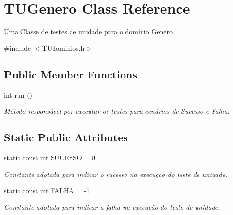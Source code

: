 \hypertarget{classTUGenero}{}\section{T\+U\+Genero Class Reference}
\label{classTUGenero}


Uma Classe de testes de unidade para o domínio \hyperlink{classGenero}{Genero}.  




{\ttfamily \#include $<$T\+Udominios.\+h$>$}

\subsection*{Public Member Functions}
\begin{DoxyCompactItemize}
\item 
int \hyperlink{classTUGenero_ade5f70b689c22924dfbd50bfabf0666c}{run} ()
\begin{DoxyCompactList}\small\item\em Método responsável por executar os testes para cenários de Sucesso e Falha. \end{DoxyCompactList}\end{DoxyCompactItemize}
\subsection*{Static Public Attributes}
\begin{DoxyCompactItemize}
\item 
\mbox{\label{classTUGenero_ab15bab45434471dc39d2f7059f6a0dbe}} 
static const int \hyperlink{classTUGenero_ab15bab45434471dc39d2f7059f6a0dbe}{S\+U\+C\+E\+S\+SO} = 0
\begin{DoxyCompactList}\small\item\em Constante adotada para indicar o sucesso na execução do teste de unidade. \end{DoxyCompactList}\item 
\mbox{\label{classTUGenero_abb6dc9bf4224ec579dcc876da2b10daa}} 
static const int \hyperlink{classTUGenero_abb6dc9bf4224ec579dcc876da2b10daa}{F\+A\+L\+HA} = -\/1
\begin{DoxyCompactList}\small\item\em Constante adotada para indicar a falha na execução do teste de unidade. \end{DoxyCompactList}\end{DoxyCompactItemize}


